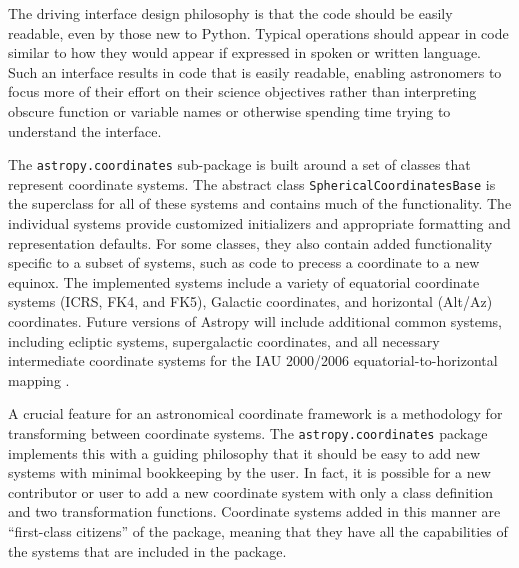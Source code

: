\documentclass[traditabstract]{aa}
\begin{document}
The driving interface design philosophy is that the code should be easily
readable, even by those new to Python. Typical operations should appear in
code similar to how they would appear if expressed in spoken or written
language. Such an interface results in code that is easily readable, enabling
astronomers to focus more of their effort on their science objectives rather
than interpreting obscure function or variable names or otherwise spending
time trying to understand the interface.




The \texttt{astropy.coordinates} sub-package is built around a set of classes
that represent coordinate systems. The abstract class
\texttt{SphericalCoordinatesBase} is the superclass for all of these systems
and contains much of the functionality. The individual systems provide
customized initializers and appropriate formatting and representation
defaults. For some classes, they also contain added functionality specific to
a subset of systems, such as code to precess a coordinate to a new equinox.
The implemented systems include a variety of equatorial coordinate systems
(ICRS, FK4, and FK5), Galactic coordinates, and horizontal (Alt/Az)
coordinates. Future versions of Astropy will include additional common
systems, including ecliptic systems, supergalactic coordinates, and all
necessary intermediate coordinate systems for the IAU 2000/2006
equatorial-to-horizontal mapping \citep[e.g.,][]{soffel03, usnocircular179}.



A crucial feature for an astronomical coordinate framework is a methodology
for transforming between coordinate systems. The \texttt{astropy.coordinates}
package implements this with a guiding philosophy that it should be easy to
add new systems with minimal bookkeeping by the user. In fact, it is possible
for a new contributor or user to add a new coordinate system with only a class
definition and two transformation functions. Coordinate systems added in this
manner are ``first-class citizens'' of the package, meaning that they have all
the capabilities of the systems that are included in the package.
\end{document}
